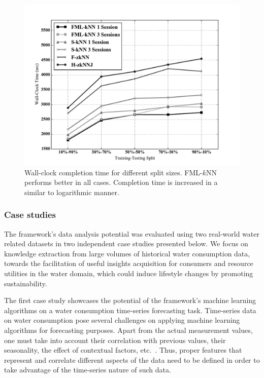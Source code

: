\begin{figure}[h!]
	\centering
	\includegraphics[width=\textwidth]{figures/figure7.pdf}
	\caption{Wall-clock completion time for different split sizes. FML-$k$NN performs better in all cases. Completion time is increased in a similar to logarithmic manner.}
	\label{figure7}
\end{figure}

\subsubsection{Case studies}
\label{subsec:case_studies}
The framework's data analysis potential was evaluated using two real-world water related datasets in two independent case studies presented below. We focus on knowledge extraction from large volumes of historical water consumption data, towards the facilitation of useful insights acquisition for consumers and resource utilities in the water domain, which could induce lifestyle changes by promoting sustainability.

\label{subsubsec:case_study1}
The first case study showcases the potential of the framework's machine learning algorithms on a water consumption time-series forecasting task. Time-series data on water consumption pose several challenges on applying machine learning algorithms for forecasting purposes. Apart from the actual measurement values, one must take into account their correlation with previous values, their seasonality, the effect of contextual factors, etc.~\cite{wrcr12805}. Thus, proper features that represent and correlate different aspects of the data need to be defined in order to take advantage of the time-series nature of such data.

